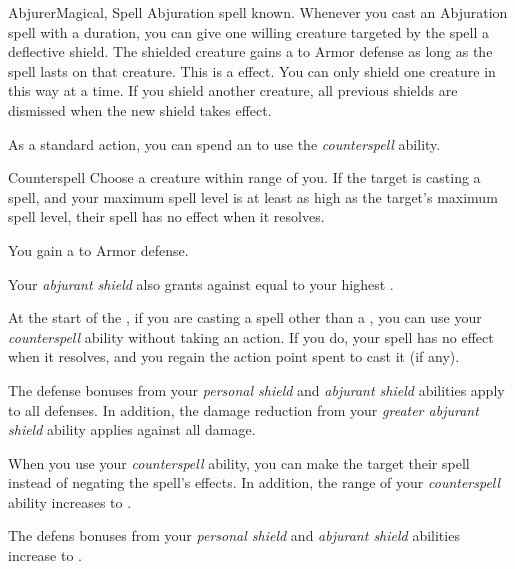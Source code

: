     \begin{feat}{Abjurer}{Magical, Spell}
        \featpre Abjuration spell known.
         Whenever you cast an Abjuration spell with a duration, you can give one willing creature targeted by the spell a deflective shield.
        The shielded creature gains a   to Armor defense as long as the spell lasts on that creature.
        This is a   effect.
        You can only shield one creature in this way at a time.
        If you shield another creature, all previous shields are dismissed when the new shield takes effect.

         As a standard action, you can spend an  to use the \textit{counterspell} ability.
        \begin{ability}{Counterspell}
            Choose a creature within \rngmed range of you.
            If the target is casting a spell, and your maximum spell level is at least as high as the target's maximum spell level, their spell has no effect when it resolves.
        \end{ability}

         You gain a   to Armor defense.

         Your \textit{abjurant shield} also grants  against  equal to your highest .

         At the start of the , if you are casting a spell other than a , you can use your \textit{counterspell} ability without taking an action.
        If you do, your spell has no effect when it resolves, and you regain the action point spent to cast it (if any).

         The defense bonuses from your \textit{personal shield} and \textit{abjurant shield} abilities apply to all defenses.
        In addition, the damage reduction from your \textit{greater abjurant shield} ability applies against all damage.

         When you use your \textit{counterspell} ability, you can make the target  their spell instead of negating the spell's effects.
        In addition, the range of your \textit{counterspell} ability increases to \rnglong.

         The defens bonuses from your \textit{personal shield} and \textit{abjurant shield} abilities increase to .
    \end{feat}

